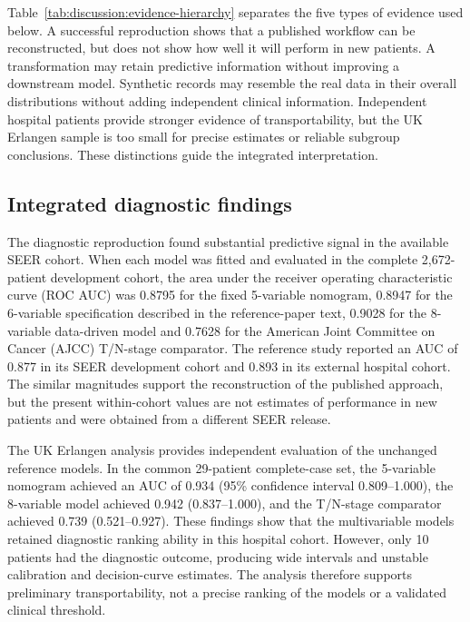 Table~\ref{tab:discussion:evidence-hierarchy} separates the five types of
evidence used below.  A successful reproduction shows that a published workflow
can be reconstructed, but does not show how well it will perform in new
patients.  A transformation may retain predictive information without
improving a downstream model.  Synthetic records may resemble the real data in
their overall distributions without adding independent clinical information.
Independent hospital patients provide stronger evidence of transportability,
but the UK Erlangen sample is too small for precise estimates or reliable
subgroup conclusions.  These distinctions guide the integrated interpretation.

\subsection{Integrated diagnostic findings}
\label{sec:discussion:diagnostic}

The diagnostic reproduction found substantial predictive signal in the
available SEER cohort.  When each model was fitted and evaluated in the complete
2,672-patient development cohort, the area under the receiver operating
characteristic curve (ROC AUC) was 0.8795 for the fixed 5-variable nomogram,
0.8947 for the 6-variable specification described in the reference-paper text,
0.9028 for the 8-variable data-driven model and 0.7628 for the American Joint
Committee on Cancer (AJCC) T/N-stage comparator.  The reference study reported
an AUC of 0.877 in its SEER development cohort and 0.893 in its external
hospital cohort.  The similar magnitudes support the reconstruction of the
published approach, but the present within-cohort values are not estimates of
performance in new patients and were obtained from a different SEER release.

The UK Erlangen analysis provides independent evaluation of the unchanged
reference models.  In the common 29-patient complete-case set, the 5-variable
nomogram achieved an AUC of 0.934 (95\% confidence interval 0.809--1.000), the
8-variable model achieved 0.942 (0.837--1.000), and the T/N-stage comparator
achieved 0.739 (0.521--0.927).  These findings show that the multivariable
models retained diagnostic ranking ability in this hospital cohort.  However,
only 10 patients had the diagnostic outcome, producing wide intervals and
unstable calibration and decision-curve estimates.  The analysis therefore
supports preliminary transportability, not a precise ranking of the models or
a validated clinical threshold.

